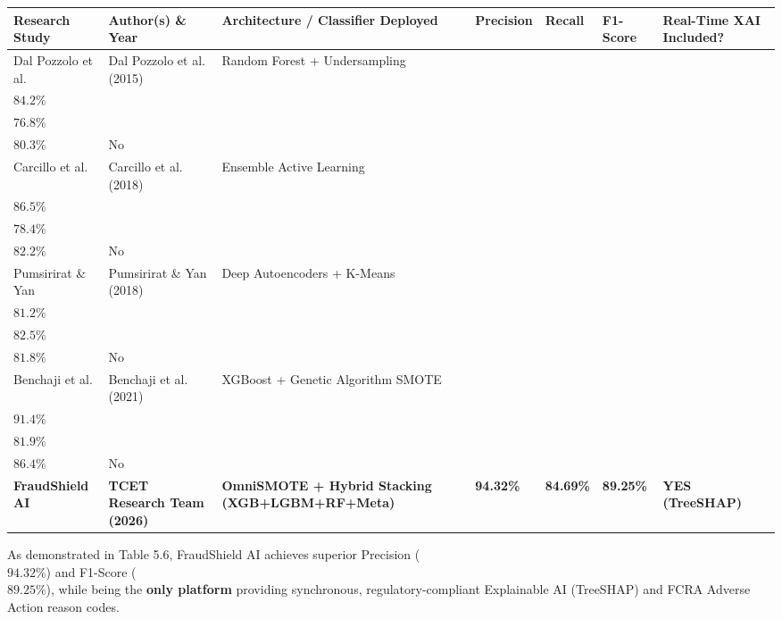 \documentclass[12pt,a4paper,oneside]{report}
\begin{document}
\begin{table}[H]
\centering
\footnotesize
\begin{adjustbox}{width=\textwidth,center}
\begin{tabular}{| l | l | l | l | l | l | l |}
\hline
\rowcolor{tableheader} \textbf{Research Study} & \textbf{Author(s) \& Year} & \textbf{Architecture / Classifier Deployed} & \textbf{Precision} & \textbf{Recall} & \textbf{F1-Score} & \textbf{Real-Time XAI Included?} \\ \hline
Dal Pozzolo et al. & Dal Pozzolo et al. (2015) & Random Forest + Undersampling & \\$84.2\%$ & \\$76.8\%$ & \\$80.3\%$ & No \\ \hline
\rowcolor{tablealt} Carcillo et al. & Carcillo et al. (2018) & Ensemble Active Learning & \\$86.5\%$ & \\$78.4\%$ & \\$82.2\%$ & No \\ \hline
Pumsirirat \& Yan & Pumsirirat \& Yan (2018) & Deep Autoencoders + K-Means & \\$81.2\%$ & \\$82.5\%$ & \\$81.8\%$ & No \\ \hline
\rowcolor{tablealt} Benchaji et al. & Benchaji et al. (2021) & XGBoost + Genetic Algorithm SMOTE & \\$91.4\%$ & \\$81.9\%$ & \\$86.4\%$ & No \\ \hline
\textbf{FraudShield AI} & \textbf{TCET Research Team (2026)} & \textbf{OmniSMOTE + Hybrid Stacking (XGB+LGBM+RF+Meta)} & \textbf{94.32\%} & \textbf{84.69\%} & \textbf{89.25\%} & \textbf{YES (TreeSHAP)} \\ \hline
\end{tabular}
\end{adjustbox}
\end{table}

As demonstrated in Table 5.6, FraudShield AI achieves superior Precision (\\$94.32\%$) and F1-Score (\\$89.25\%$), while being the \textbf{only platform} providing synchronous, regulatory-compliant Explainable AI (TreeSHAP) and FCRA Adverse Action reason codes.
\end{document}

